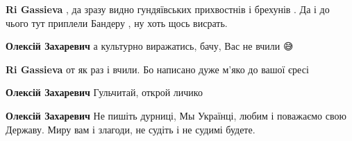 \begin{itemize}
\begin{itemize}
 
\textbf{Ri Gassieva} , да зразу видно гундяївських прихвостнів і брехунів . Да
і до чього тут приплели Бандеру , ну хоть щось висрать.

\begin{itemize}
 
\textbf{Олексій Захаревич} а культурно виражатись, бачу, Вас не вчили 😅

 
\textbf{Ri Gassieva} от як раз і вчили. Бо написано дуже м’яко до вашої єресі
\end{itemize}

 

\textbf{Олексій Захаревич} Гульчитай, открой личико🤫😝

 
\textbf{Олексій Захаревич} Не пишіть дурниці, Мы Українці, любим і поважаємо
свою Державу. Миру вам і злагоди, не судіть і не судимі будете.

\end{itemize}

 


\end{itemize}
